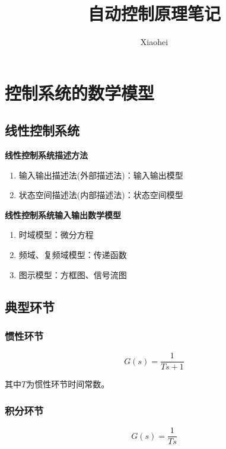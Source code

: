 \documentclass[cn, blue, normal, 12pt]{elegantnote}
\title{自动控制原理笔记}
\author{Xiaohei}
\date{\zhtoday}
\begin{document}
\setlength{\lineskip}{0}
\setlength{\parskip}{0}

\maketitle

\section{控制系统的数学模型}

\subsection{线性控制系统}

\textbf{线性控制系统描述方法}

\begin{enumerate}
    \item 输入输出描述法(外部描述法)：输入输出模型
    \item 状态空间描述法(内部描述法)：状态空间模型
\end{enumerate}

\textbf{线性控制系统输入输出数学模型}

\begin{enumerate}
    \item 时域模型：微分方程
    \item 频域、复频域模型：传递函数
    \item 图示模型：方框图、信号流图
\end{enumerate}

\subsection{典型环节}

\subsubsection{惯性环节}

\begin{equation}
    G(s)=\frac{1}{Ts+1}
\end{equation}

其中$T$为惯性环节时间常数。

\subsubsection{积分环节}

\begin{equation}
    G(s)=\frac{1}{Ts}
\end{equation}
\end{document}
